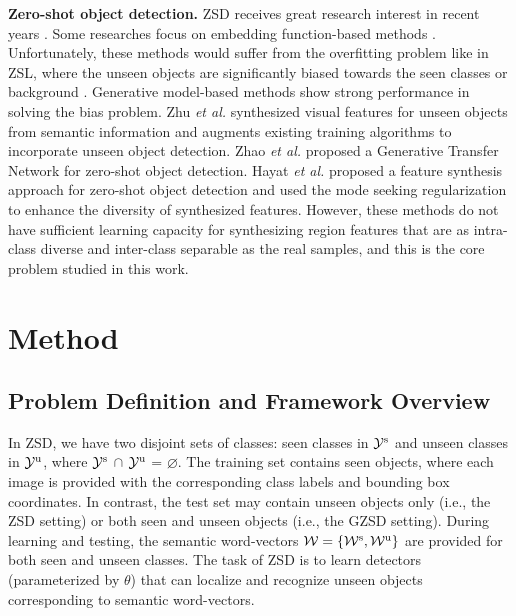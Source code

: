 \documentclass[10pt,twocolumn,letterpaper]{article}
\begin{document}
\textbf{Zero-shot object detection.} ZSD receives great research interest in recent years \cite{rahman2018zero, bansal2018zero, demirel2018zero, li2019zero, zheng2020background, rahman2020improved, zhu2020don, zhao2020gtnet, hayat2020synthesizing}. Some researches focus on embedding function-based methods \cite{rahman2018zero, bansal2018zero, demirel2018zero, li2019zero, zheng2020background, rahman2020improved}. Unfortunately, these methods would suffer from the overfitting problem like in ZSL, where the unseen objects are significantly biased towards the seen classes or background \cite{hayat2020synthesizing}. Generative model-based methods \cite{zhu2020don, zhao2020gtnet, hayat2020synthesizing} show strong performance in solving the bias problem. Zhu \emph{et al.} \cite{zhu2020don} synthesized visual features for unseen objects from semantic information and augments existing training algorithms to incorporate unseen object detection. Zhao \emph{et al.} \cite{zhao2020gtnet} proposed a Generative Transfer Network for zero-shot object detection. Hayat \emph{et al.}\cite{hayat2020synthesizing} proposed a feature synthesis approach for zero-shot object detection and used the mode seeking regularization \cite{mao2019mode} to enhance the diversity of synthesized features. However, these methods do not have sufficient learning capacity for synthesizing region features that are as intra-class diverse and inter-class separable as the real samples, and this is the core problem studied in this work.


\section{Method}
\label{sec:formatting}
\subsection{Problem Definition and Framework Overview}
In ZSD, we have two disjoint sets of classes: seen classes in $\mathcal{Y}^{\rm s}$ and unseen classes in $\mathcal{Y}^{\rm u}$, where $\mathcal{Y}^{\rm s}$ $\cap$ $\mathcal{Y}^{\rm u}$ = $\varnothing$. The training set contains seen objects,
where each image is provided with the corresponding class labels and bounding box coordinates. In contrast, the test set may contain unseen objects only (i.e., the ZSD setting) or both seen and unseen objects (i.e., the GZSD setting). During learning and testing, the semantic word-vectors $\mathcal{W}=\{\mathcal{W}^{\rm s},\mathcal{W}^{ \rm u}\}$ are provided for both seen and unseen classes. The task of ZSD is to learn detectors (parameterized by $\theta$) that can localize and recognize unseen objects corresponding to semantic word-vectors.
\end{document}
